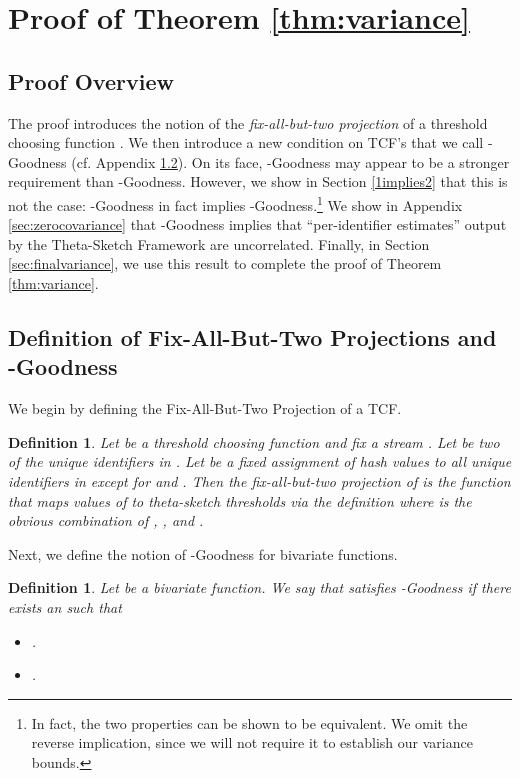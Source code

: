 \documentclass{article}
\newtheorem{definition}[theorem]{Definition}
\begin{document}
\section{Proof of Theorem \ref{thm:variance}}
\label{app:variance}
\subsection{Proof Overview} 
The proof introduces the notion of the \emph{fix-all-but-two projection}
of a threshold choosing function . We then introduce 
a new condition on TCF's that
we call -Goodness (cf. Appendix \ref{sec:twogood}). On its face, -Goodness may appear to be a stronger requirement than -Goodness. However,
we show in Section \ref{1implies2} that this is not the case: -Goodness in fact implies -Goodness.\footnote{In fact, the two properties can
be shown to be equivalent. We omit the reverse implication, since we will not require it to establish our variance bounds.}
We show in Appendix \ref{sec:zerocovariance} that -Goodness implies that ``per-identifier estimates'' output by the Theta-Sketch Framework
are uncorrelated. Finally, in Section \ref{sec:finalvariance}, we use this result to complete the proof of Theorem \ref{thm:variance}.

\subsection{Definition of Fix-All-But-Two Projections and -Goodness}
\label{sec:twogood} 
We begin by defining the Fix-All-But-Two Projection of a TCF.

\begin{definition}\label{def:fabt-projection}
Let  be a threshold choosing function and fix a stream .
Let  be two of the  unique identifiers in . Let  be a fixed assignment of 
hash values to all unique identifiers in  {\em except} for  and . 
Then the fix-all-but-two projection  of 
is the function that maps values of  to theta-sketch thresholds via the definition
 where  is the obvious combination of , , and .
\end{definition}

Next, we define the notion of -Goodness for bivariate functions. 
\begin{definition}\label{def:bivariate2goodness}
Let  be a bivariate function. We say that  satisfies -Goodness if
there exists an  such that

\begin{itemize}
\item .
\item .
\end{itemize}
\end{definition}
\end{document}
